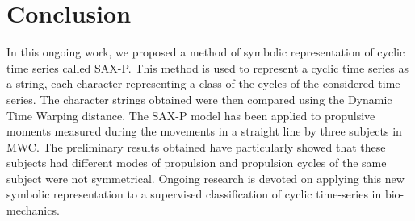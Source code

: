 \section{Conclusion}
In this ongoing work, we proposed a method of symbolic representation of cyclic time series called SAX-P.
This method is used to represent a cyclic time series as a string, each character representing a
class of the cycles of the considered time series. The character strings
obtained were then compared using the Dynamic Time Warping distance.
 The SAX-P model has been applied to propulsive moments measured during the movements in a straight
 line by three subjects in MWC. The preliminary results obtained have particularly showed that these
 subjects had different modes of propulsion and propulsion cycles of the same subject were not 
 symmetrical. Ongoing research is devoted on applying this new symbolic representation to a 
 supervised classification of cyclic time-series in bio-mechanics.